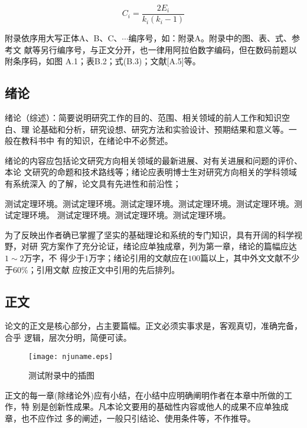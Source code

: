 \documentclass[master]{njuthesis}
\begin{document}
\begin{equation}
    C_i = \frac{2E_i}{k_i(k_i-1)}
\end{equation}

附录依序用大写正体A、B、C、$\cdots$编序号，如：附录A。附录中的图、表、式、参考文
献等另行编序号，与正文分开，也一律用阿拉伯数字编码，但在数码前题以附条序码，如图
A.1；表B.2；式(B.3)；文献[A.5]等。

\subsection{绪论}

绪论（综述）：简要说明研究工作的目的、范围、相关领域的前人工作和知识空白、理
论基础和分析，研究设想、研究方法和实验设计、预期结果和意义等。一般在教科书中
有的知识，在绪论中不必赘述。

绪论的内容应包括论文研究方向相关领域的最新进展、对有关进展和问题的评价、本论
文研究的命题和技术路线等；绪论应表明博士生对研究方向相关的学科领域有系统深入
的了解，论文具有先进性和前沿性；

\begin{problem}
测试定理环境。测试定理环境。测试定理环境。测试定理环境。测试定理环境。测试定理环境。
测试定理环境。测试定理环境。测试定理环境。
\end{problem}

为了反映出作者确已掌握了坚实的基础理论和系统的专门知识，具有开阔的科学视野，对研
究方案作了充分论证，绪论应单独成章，列为第一章，绪论的篇幅应达$1\sim 2$万字，不
得少于$1$万字；绪论引用的文献应在$100$篇以上，其中外文文献不少于$60\%$；引用文献
应按正文中引用的先后排列。

\subsection{正文}

论文的正文是核心部分，占主要篇幅。正文必须实事求是，客观真切，准确完备，合乎
逻辑，层次分明，简便可读。

\begin{figure}[htbp]
  \centering
  \texttt{[image: njuname.eps]}\\
  \caption{测试附录中的插图}\label{fig:appendix2}
\end{figure}

正文的每一章(除绪论外)应有小结，在小结中应明确阐明作者在本章中所做的工作，特
别是创新性成果。凡本论文要用的基础性内容或他人的成果不应单独成章，也不应作过
多的阐述，一般只引结论、使用条件等，不作推导。
\end{document}
